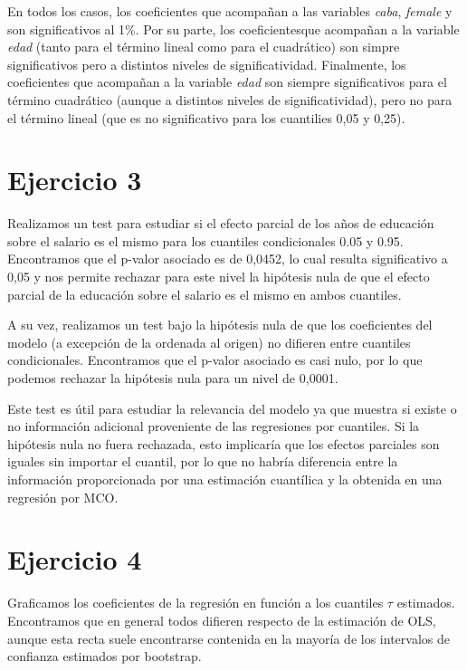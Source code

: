 \documentclass[11pt]{article}
\begin{document}
En todos los casos, los coeficientes que acompañan a las variables \emph{caba}, \emph{female} y son significativos al 1\%. Por su parte, los coeficientesque acompañan a la variable \emph{edad} (tanto para el término lineal como para el cuadrático) son simpre significativos pero a distintos niveles de significatividad. Finalmente, los coeficientes que acompañan a la variable \emph{edad} son siempre significativos para el término cuadrático (aunque a distintos niveles de significatividad), pero no para el término lineal (que es no significativo para los cuantilies 0,05 y 0,25). 

\section*{Ejercicio 3}

Realizamos un test para estudiar si el efecto parcial de los años de educación sobre el salario es el mismo para los cuantiles condicionales 0.05 y 0.95. Encontramos que el p-valor asociado es de 0,0452, lo cual resulta significativo a 0,05 y nos permite rechazar para este nivel la hipótesis nula de que el efecto parcial de la educación sobre el salario es el mismo en ambos cuantiles.

A su vez, realizamos un test bajo la hipótesis nula de que los coeficientes del modelo (a excepción de la ordenada al origen) no difieren entre cuantiles condicionales. Encontramos que el p-valor asociado es casi nulo, por lo que podemos rechazar la hipótesis nula para un nivel de 0,0001. 

Este test es útil para estudiar la relevancia del modelo ya que muestra si existe o no información adicional proveniente de las regresiones por cuantiles. Si la hipótesis nula no fuera rechazada, esto implicaría que los efectos parciales son iguales sin importar el cuantil, por lo que no habría diferencia entre la información proporcionada por una estimación cuantílica y la obtenida en una regresión por MCO.

\section*{Ejercicio 4}

Graficamos los coeficientes de la regresión en función a los cuantiles $\tau$ estimados. Encontramos que en general todos difieren respecto de la estimación de OLS, aunque esta recta suele encontrarse contenida en la mayoría de los intervalos de confianza estimados por bootstrap. 
\end{document}

